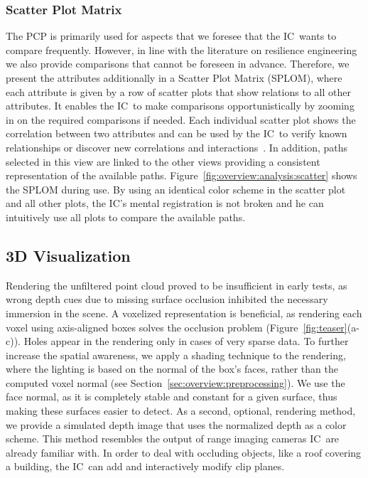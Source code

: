 \documentclass[conference,10pt,letter]{IEEEtran}
\def\IC{IC}
\begin{document}
\subsubsection{Scatter Plot Matrix} \label{sec:overview:analysis:scatter}
The PCP is primarily used for aspects that we foresee that the \IC\ wants to compare frequently. However, in line with the literature on resilience engineering~\cite{Lundberg2012} we also provide comparisons that cannot be foreseen in advance. Therefore, we present the attributes additionally in a Scatter Plot Matrix (SPLOM), where each attribute is given by a row of scatter plots that show relations to all other attributes. It enables the \IC\ to make comparisons opportunistically by zooming in on the required comparisons if needed. Each individual scatter plot shows the correlation between two attributes and can be used by the \IC\ to verify known relationships or discover new correlations and interactions~\cite{Li2008}. In addition, paths selected in this view are linked to the other views providing a consistent representation of the available paths. Figure~\ref{fig:overview:analysis:scatter} shows the SPLOM during use. By using an identical color scheme in the scatter plot and all other plots, the \IC 's mental registration is not broken and he can intuitively use all plots to compare the available paths.


\subsection{3D Visualization} \label{sec:overview:3dvisualization}
 Rendering the unfiltered point cloud proved to be insufficient in early tests, as wrong depth cues due to missing surface occlusion inhibited the necessary immersion in the scene. A voxelized representation is beneficial, as rendering each voxel using axis-aligned boxes solves the occlusion problem (Figure~\ref{fig:teaser}(a-c)). Holes appear in the rendering only in cases of very sparse data. To further increase the spatial awareness, we apply a shading technique to the rendering, where the lighting is based on the normal of the box's faces, rather than the computed voxel normal (see Section~\ref{sec:overview:preprocessing}). We use the face normal, as it is completely stable and constant for a given surface, thus making these surfaces easier to detect. As a second, optional, rendering method, we provide a simulated depth image that uses the normalized depth as a color scheme. This method resembles the output of range imaging cameras \IC\ are already familiar with. In order to deal with occluding objects, like a roof covering a building, the \IC\ can add and interactively modify clip planes.
\end{document}
